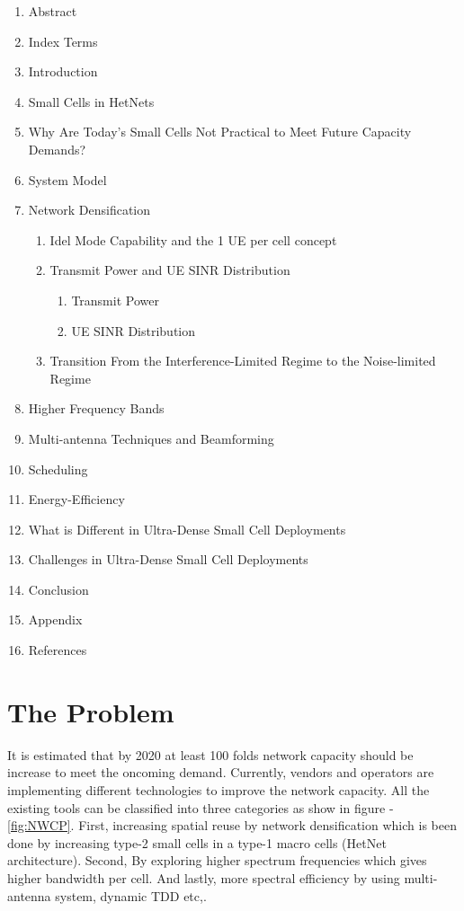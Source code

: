 \documentclass[12pt,onecolumn]{IEEEtran}
\begin{document}
 \renewcommand{\theenumi}{\Roman{enumi}}
 \begin{enumerate}
   \item Abstract
   \item Index Terms
   \item Introduction
   \item Small Cells in HetNets
   \item Why Are Today's Small Cells Not Practical to Meet Future Capacity Demands?
   \item System Model
   \item Network Densification
   \begin{enumerate}
     \item Idel Mode Capability and the 1 UE per cell concept
     \item Transmit Power and UE SINR Distribution
     \begin{enumerate}
     \item Transmit Power
     \item UE SINR Distribution
     \end{enumerate}
     \item Transition From the Interference-Limited Regime to the Noise-limited Regime
     \end{enumerate}
   \item Higher Frequency Bands
   \item Multi-antenna Techniques and Beamforming
   \item Scheduling
   \item Energy-Efficiency
   \item What is Different in Ultra-Dense Small Cell Deployments
   \item Challenges in Ultra-Dense Small Cell Deployments
   \item Conclusion
   \item Appendix
   \item References
 \end{enumerate}

\section{The Problem}
\label{sec:TP}
It is estimated that by 2020 at least 100 folds network capacity should be increase to meet the oncoming demand. Currently, vendors and operators are implementing different technologies to improve the network capacity. All the existing tools can be classified into three categories as show in figure - \ref{fig:NWCP}. First, increasing spatial reuse by network densification  which is been done by increasing type-2 small cells in a type-1 macro cells (HetNet architecture). Second, By exploring higher spectrum frequencies which gives higher bandwidth per cell. And lastly, more spectral efficiency by using multi-antenna system, dynamic TDD etc,. 
\end{document}
